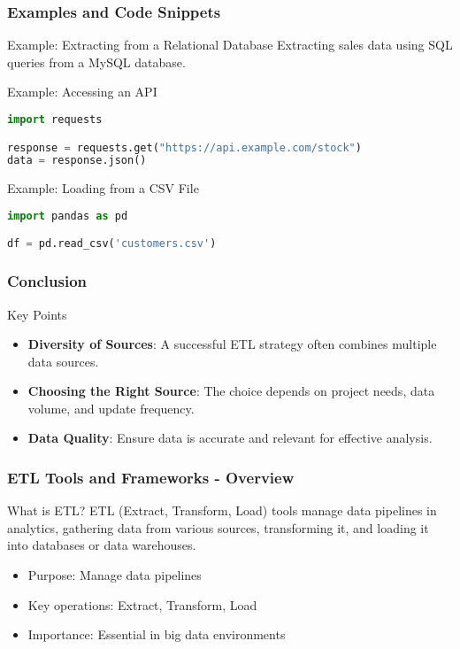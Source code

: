 \documentclass[aspectratio=169]{beamer}
\begin{document}
\begin{frame}[fragile]
    \frametitle{Examples and Code Snippets}
    \begin{block}{Example: Extracting from a Relational Database}
        Extracting sales data using SQL queries from a MySQL database.
    \end{block}

    \begin{block}{Example: Accessing an API}
    \begin{lstlisting}[language=Python]
import requests

response = requests.get("https://api.example.com/stock")
data = response.json()
    \end{lstlisting}
    \end{block}

    \begin{block}{Example: Loading from a CSV File}
    \begin{lstlisting}[language=Python]
import pandas as pd

df = pd.read_csv('customers.csv')
    \end{lstlisting}
    \end{block}
\end{frame}

\begin{frame}[fragile]
    \frametitle{Conclusion}
    \begin{block}{Key Points}
        \begin{itemize}
            \item \textbf{Diversity of Sources}: A successful ETL strategy often combines multiple data sources.
            \item \textbf{Choosing the Right Source}: The choice depends on project needs, data volume, and update frequency.
            \item \textbf{Data Quality}: Ensure data is accurate and relevant for effective analysis.
        \end{itemize}
    \end{block}
\end{frame}

\begin{frame}[fragile]
    \frametitle{ETL Tools and Frameworks - Overview}
    \begin{block}{What is ETL?}
        ETL (Extract, Transform, Load) tools manage data pipelines in analytics, gathering data from various sources, transforming it, and loading it into databases or data warehouses.
    \end{block}

    \begin{itemize}
        \item Purpose: Manage data pipelines
        \item Key operations: Extract, Transform, Load
        \item Importance: Essential in big data environments
    \end{itemize}
\end{frame}
\end{document}
